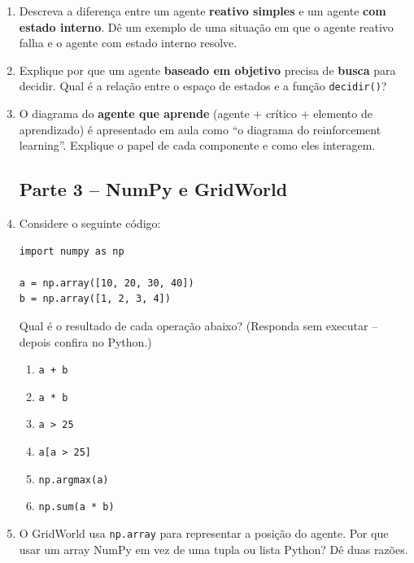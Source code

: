 \documentclass[12pt,a4paper]{article}
\begin{document}
\begin{enumerate}[label=\textbf{Q\arabic*.}, leftmargin=*]
\subsection*{Parte 2 -- Tipos de Agente}

\item Descreva a diferença entre um agente \textbf{reativo simples} e um agente \textbf{com estado interno}. Dê um exemplo de uma situação em que o agente reativo falha e o agente com estado interno resolve.

\item Explique por que um agente \textbf{baseado em objetivo} precisa de \textbf{busca} para decidir. Qual é a relação entre o espaço de estados e a função \texttt{decidir()}?

\item O diagrama do \textbf{agente que aprende} (agente + crítico + elemento de aprendizado) é apresentado em aula como ``o diagrama do reinforcement learning''. Explique o papel de cada componente e como eles interagem.

\subsection*{Parte 3 -- NumPy e GridWorld}

\item Considere o seguinte código:

\begin{lstlisting}
import numpy as np

a = np.array([10, 20, 30, 40])
b = np.array([1, 2, 3, 4])
\end{lstlisting}

Qual é o resultado de cada operação abaixo? (Responda sem executar -- depois confira no Python.)

\begin{enumerate}
  \item \texttt{a + b}
  \item \texttt{a * b}
  \item \texttt{a > 25}
  \item \texttt{a[a > 25]}
  \item \texttt{np.argmax(a)}
  \item \texttt{np.sum(a * b)}
\end{enumerate}

\item O GridWorld usa \texttt{np.array} para representar a posição do agente. Por que usar um array NumPy em vez de uma tupla ou lista Python? Dê duas razões.


\end{enumerate}
\end{document}
